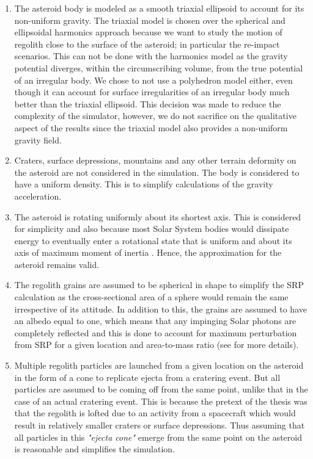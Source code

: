 \begin{enumerate}
\item The asteroid body is modeled as a smooth triaxial ellipsoid to account for its non-uniform gravity. The triaxial model is chosen over the spherical and ellipsoidal harmonics approach because we want to study the motion of regolith close to the surface of the asteroid; in particular the re-impact scenarios. This can not be done with the harmonics model as the gravity potential diverges, within the circumscribing volume, from the true potential of an irregular body. We chose to not use a polyhedron model either, even though it can account for surface irregularities of an irregular body much better than the triaxial ellipsoid. This decision was made to reduce the complexity of the simulator, however, we do not sacrifice on the qualitative aspect of the results since the triaxial model also provides a non-uniform gravity field.

\item Craters, surface depressions, mountains and any other terrain deformity on the asteroid are not considered in the simulation. The body is considered to have a uniform density. This is to simplify calculations of the gravity acceleration.

\item The asteroid is rotating uniformly about its shortest axis. This is considered for simplicity and also because most Solar System bodies would dissipate energy to eventually enter a rotational state that is uniform and about its axis of maximum moment of inertia \parencite{scheeresBook}. Hence, the approximation for the asteroid remains valid.

\item The regolith grains are assumed to be spherical in shape to simplify the \gls{SRP} calculation as the cross-sectional area of a sphere would remain the same irrespective of its attitude. In addition to this, the grains are assumed to have an albedo equal to one, which means that any impinging Solar photons are completely reflected and this is done to account for maximum perturbation from \gls{SRP} for a given location and area-to-mass ratio (see  for more details).

\item Multiple regolith particles are launched from a given location on the asteroid in the form of a cone to replicate ejecta from a cratering event. But all particles are assumed to be coming off from the same point, unlike that in the case of an actual cratering event. This is because the pretext of the thesis was that the regolith is lofted due to an activity from a spacecraft which would result in relatively smaller craters or surface depressions. Thus assuming that all particles in this \textit{"ejecta cone"} emerge from the same point on the asteroid is reasonable and simplifies the simulation.


\end{enumerate}
